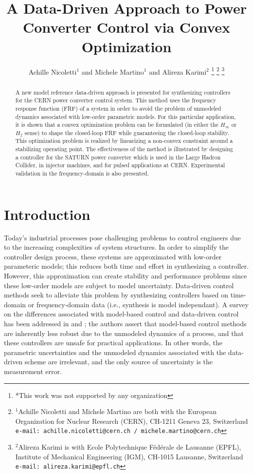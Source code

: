 \documentclass[a4paper, 10pt, conference]{ieeeconf}
\title{A Data-Driven Approach to Power Converter Control via Convex Optimization}
\author{Achille Nicoletti$^{1}$ and Michele Martino$^{1}$ and Alireza Karimi$^{2}$%
\thanks{*This work was not supported by any organization}%
\thanks{$^{1}$Achille Nicoletti and Michele Martino are both with the European Organization for Nuclear Research (CERN), 
 CH-1211 Geneva 23, Switzerland
        {\tt\small  e-mail: achille.nicoletti@cern.ch / michele.martino@cern.ch}}%
\thanks{$^{2}$Alireza Karimi is with Ecole Polytechnique F\'{e}d\'{e}rale de Lausanne (EPFL), Institute of Mechanical Engineering (IGM),
   CH-1015 Lausanne, Switzerland
        {\tt\small e-mail: alireza.karimi@epfl.ch}}%
}
\begin{document}
\maketitle
\thispagestyle{empty}
\pagestyle{empty}

\begin{abstract}                %
A new model reference data-driven approach is presented for synthesizing controllers for the CERN power converter control system. This method uses the frequency response function (FRF) of a system in order to avoid the problem of unmodeled dynamics associated with low-order parametric models. For this particular application, it is shown that a convex optimization problem can be formulated (in either the $H_\infty$ or $H_2$ sense) to shape the closed-loop FRF while guaranteeing the closed-loop stability. This optimization problem is realized by linearizing a non-convex constraint around a stabilizing operating point. The effectiveness of the method is illustrated by designing a controller for the SATURN power converter which is used in the Large Hadron Collider, in injector machines, and for pulsed applications at CERN. Experimental validation in the frequency-domain is also presented. 
\end{abstract}


\section{Introduction}
Today's industrial processes pose challenging problems to control engineers due to the increasing complexities of system structures. In order to simplify the controller design process, these systems are approximated with low-order parameteric models; this reduces both time and effort in synthesizing a controller. However, this approximation can create stability and performance problems since these low-order models are subject to model uncertainty. Data-driven control methods seek to alleviate this problem by synthesizing controllers based on time-domain or frequency-domain data (i.e., synthesis is model independant). A survey on the differences associated with model-based control and data-driven control has been addressed in \cite{HW13} and \cite{FK13a}; the authors assert that model-based control methods are inherently less robust due to the unmodeled dynamics of a process, and that these controllers are unsafe for practical applications. In other words, the parametric uncertainties and the unmodeled dynamics associated with the data-driven scheme are irrelevant, and the only source of uncertainty is the measurement error. 
\end{document}
